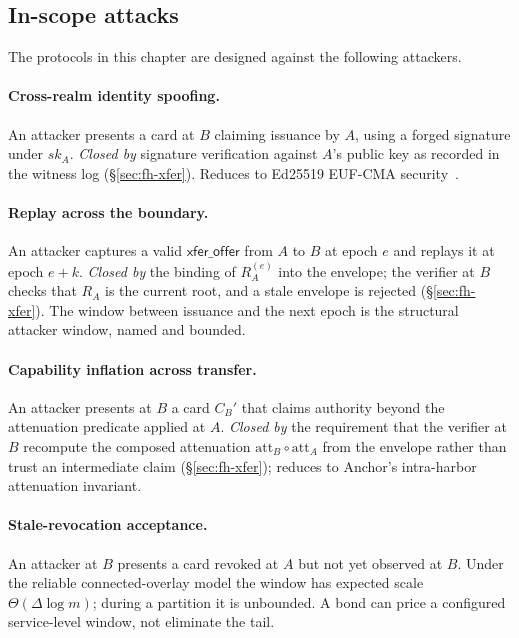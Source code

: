 \documentclass[11pt,a4paper]{article}
\theoremstyle{definition}
\theoremstyle{remark}
\begin{document}
\subsection{In-scope attacks}\label{sec:fh-attacks-in}

The protocols in this chapter are designed against the following attackers.

\paragraph{Cross-realm identity spoofing.} An attacker presents a card at $B$ claiming issuance by $A$, using a forged signature under $\mathit{sk}_A$. \emph{Closed by} signature verification against $A$'s public key as recorded in the witness log (\S\ref{sec:fh-xfer}). Reduces to Ed25519 EUF-CMA security~.

\paragraph{Replay across the boundary.} An attacker captures a valid $\mathsf{xfer\_offer}$ from $A$ to $B$ at epoch $e$ and replays it at epoch $e+k$. \emph{Closed by} the binding of $R_A^{(e)}$ into the envelope; the verifier at $B$ checks that $R_A$ is the current root, and a stale envelope is rejected (\S\ref{sec:fh-xfer}). The window between issuance and the next epoch is the structural attacker window, named and bounded.

\paragraph{Capability inflation across transfer.} An attacker presents at $B$ a card $C_B'$ that claims authority beyond the attenuation predicate applied at $A$. \emph{Closed by} the requirement that the verifier at $B$ recompute the composed attenuation $\mathrm{att}_B \circ \mathrm{att}_A$ from the envelope rather than trust an intermediate claim (\S\ref{sec:fh-xfer}); reduces to Anchor's intra-harbor attenuation invariant.

\paragraph{Stale-revocation acceptance.} An attacker at $B$ presents a card revoked at $A$ but not yet observed at $B$. Under the reliable connected-overlay model the window has expected scale $\Theta(\Delta\log m)$; during a partition it is unbounded. A bond can price a configured service-level window, not eliminate the tail.
\end{document}
